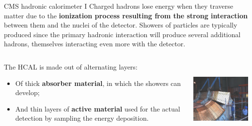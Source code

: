 \documentclass[8pt]{beamer}
\begin{document}
\begin{frame}{CMS hadronic calorimeter I}
\justifying
\vspace{10pt}
Charged hadrons \alert{lose energy when they traverse matter} due to the \textbf{ionization process resulting from the strong interaction} between them and the nuclei of the detector. \vfill
Showers of particles are typically produced since the primary hadronic interaction will produce several additional hadrons, themselves interacting even more with the detector. \vfill

\begin{columns}
	\begin{column}{0.52 \textwidth}
The HCAL is made out of alternating layers:
\vspace{-10pt}
\begin{itemize}
\justifying
\item Of thick \textbf{absorber material}, in which the showers can develop;
\item And thin layers of \textbf{active material} used for the actual detection by sampling the energy deposition.
\end{itemize}
\end{column}
	\begin{column}{0.45 \textwidth}
	\begin{center}
\includegraphics[width=5.2cm, height=4cm]{figs/CMSHcal.jpg}
\end{center}
	\end{column}
	\end{columns} \vfill
\end{frame}
\end{document}
